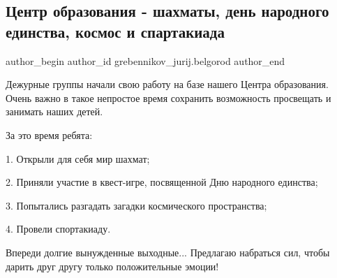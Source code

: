  
 
 
 
 
 
\subsection{Центр образования - шахматы, день народного единства, космос и спартакиада}
\label{sec:27_10_2021.fb.grebennikov_jurij.belgorod.1.centr_obrazovania_chess}
 
\ifcmt
 author_begin
   author_id grebennikov_jurij.belgorod
 author_end
\fi

Дежурные группы начали свою работу на базе нашего Центра образования. Очень
важно в такое непростое время сохранить возможность просвещать и занимать наших
детей.


За это время ребята:

1. Открыли для себя мир шахмат;

2. Приняли участие в квест-игре, посвященной Дню народного единства;

3. Попытались разгадать загадки космического пространства;

4. Провели спортакиаду. 


Впереди долгие вынужденные выходные... Предлагаю набраться сил, чтобы дарить
друг другу только положительные эмоции!
